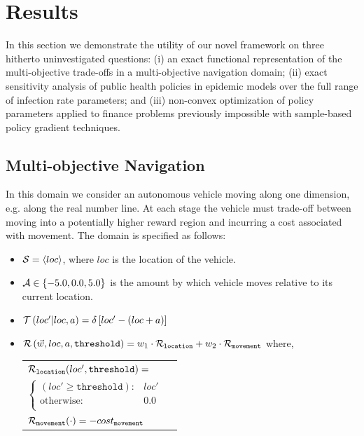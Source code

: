 \section{Results}
\label{sec:results}

In this section we demonstrate the utility of our novel framework on three hitherto uninvestigated questions: (i) an exact functional representation of the multi-objective trade-offs in a multi-objective navigation domain; (ii) exact sensitivity analysis of public health policies in epidemic models over the full range of infection rate parameters; and (iii) non-convex optimization of policy parameters applied to finance problems previously impossible with sample-based policy gradient techniques.

\subsection{Multi-objective Navigation}
\label{sec:results_navigation}

In this domain we consider an autonomous vehicle moving along one dimension, e.g. along the real number line. At each stage the vehicle must trade-off between moving into a potentially higher reward region and incurring a cost associated with movement. The domain is specified as follows:
\begin{itemize}
    \item {\footnotesize $ \mathcal{S} = \left\langle loc \right\rangle$}, where $ loc $ is the location of the vehicle.
    \item {\footnotesize $ \mathcal{A} \in \left\lbrace -5.0, 0.0, 5.0 \right\rbrace $} is the amount by which vehicle moves relative to its current location.
    \item {\footnotesize $ \mathcal{T}\left( loc' | loc, a \right) = \delta \left[ loc' - (loc + a) \right] $}
    \item {\footnotesize $ \mathcal{R}\left(\vec{w}, loc, a, \mathtt{threshold} \right) = w_1 \cdot \mathcal{R}_{\mathtt{location}} + w_2 \cdot \mathcal{R}_{\mathtt{movement}} $} where, \\
    {\footnotesize 
        \abovedisplayskip=10pt
        \belowdisplayskip=0pt
        \renewcommand{\arraystretch}{1.5}
        \begin{tabular}{ll}    
            $ \mathcal{R}_{\mathtt{location}}(loc', \mathtt{threshold}) = $ &  $ $ \\
                \qquad $ \begin{cases}
                (loc' \geq \mathtt{threshold}) : & loc' \\
                \text{otherwise} : & 0.0 \\
                \end{cases} $ & $ $\\
            $ \mathcal{R}_{\mathtt{movement}}(\cdot) = -cost_{\mathtt{movement}} $ & $ $ \\                        
        \end{tabular}
    }    
\end{itemize} 

